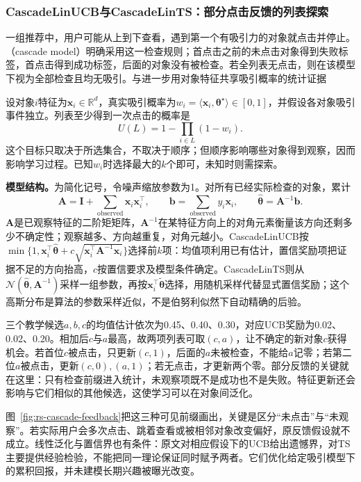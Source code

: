 \subsubsection{CascadeLinUCB与CascadeLinTS：部分点击反馈的列表探索}
\label{sec:rs-cascade-linear}

一组推荐中，用户可能从上到下查看，遇到第一个有吸引力的对象就点击并停止。（cascade model）明确采用这一检查规则；首点击之前的未点击对象得到失败标签，首点击得到成功标签，后面的对象没有被检查。若全列表无点击，则在该模型下视为全部检查且均无吸引。与进一步用对象特征共享吸引概率的统计证据

设对象$i$特征为$\bm x_i\in\mathbb R^d$，真实吸引概率为$w_i=\langle\bm x_i,\bm\theta^\star\rangle\in[0,1]$，并假设各对象吸引事件独立。列表至少得到一次点击的概率是
\begin{equation}
 U(L)=1-\prod_{i\in L}(1-w_i).
 \label{eq:rs-cascade-utility}
\end{equation}
这个目标只取决于所选集合，不取决于顺序；但顺序影响哪些对象得到观察，因而影响学习过程。已知$w_i$时选择最大的$k$个即可，未知时则需探索。

\textbf{模型结构。}为简化记号，令噪声缩放参数为1。对所有已经实际检查的对象，累计
\[
 \bm A=\bm I+\sum_{\mathrm{observed}}\bm x_i\bm x_i^\top,
 \qquad
 \bm b=\sum_{\mathrm{observed}}y_i\bm x_i,
 \qquad
 \widehat{\bm\theta}=\bm A^{-1}\bm b.
\]
$\bm A$是已观察特征的二阶矩矩阵，$\bm A^{-1}$在某特征方向上的对角元素衡量该方向还剩多少不确定性；观察越多、方向越重复，对角元越小。CascadeLinUCB按$\min\{1,\bm x_i^\top\widehat{\bm\theta}
+c\sqrt{\bm x_i^\top\bm A^{-1}\bm x_i}\}$选择前$k$项：均值项利用已有估计，置信奖励项把证据不足的方向抬高，$c$按置信要求及模型条件确定。CascadeLinTS则从$\mathcal N(\widehat{\bm\theta},\bm A^{-1})$采样一组参数，再按$\bm x_i^\top\widetilde{\bm\theta}$选择，用随机采样代替显式置信奖励；这个高斯分布是算法的参数采样近似，不是伯努利似然下自动精确的后验。

三个教学候选$a,b,c$的均值估计依次为0.45、0.40、0.30，对应UCB奖励为0.02、0.02、0.20。相加后$c$与$a$最高，故两项列表可取$(c,a)$，让不确定的新对象$c$获得机会。若首位$c$被点击，只更新$(c,1)$，后面的$a$未被检查，不能给$a$记零；若第二位$a$被点击，更新$(c,0),(a,1)$；若无点击，才更新两个零。部分反馈的关键就在这里：只有检查前缀进入统计，未观察项既不是成功也不是失败。特征更新还会影响与它们相似的其他候选，这使学习可以在对象间泛化。

图~\ref{fig:rs-cascade-feedback}把这三种可见前缀画出，关键是区分“未点击”与“未观察”。若实际用户会多次点击、跳着查看或被相邻对象改变偏好，原反馈假设就不成立。线性泛化与置信界也有条件：原文对相应假设下的UCB给出遗憾界，对TS主要提供经验检验，不能把同一理论保证同时赋予两者。它们优化给定吸引模型下的累积回报，并未建模长期兴趣被曝光改变。

